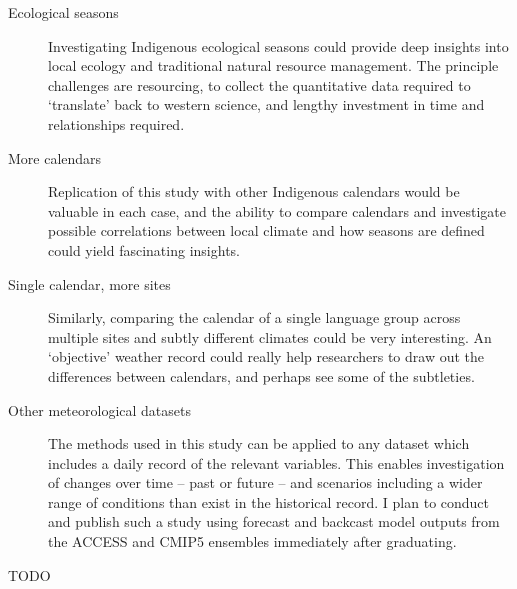 \begin{description}
\item[Ecological seasons]
        Investigating Indigenous ecological seasons could provide deep insights
        into local ecology and traditional natural resource management.
        The principle challenges are resourcing, to collect the quantitative
        data required to `translate' back to western science, and lengthy
        investment in time and relationships required.

\item [More calendars]
        Replication of this study with other Indigenous calendars would be
        valuable in each case, and the ability to compare calendars and investigate
        possible correlations between local climate and how seasons are
        defined could yield fascinating insights.

\item [Single calendar, more sites]
        Similarly, comparing the calendar of a single language group across
        multiple sites and subtly different climates could be very interesting.
        An `objective' weather record could really help researchers to draw out
        the differences between calendars, and perhaps see some of the subtleties.

\item [Other meteorological datasets]
        The methods used in this study can be applied to any dataset which
        includes a daily record of the relevant variables.  This enables
        investigation of changes over time -- past or future -- and scenarios
        including a wider range of conditions than exist in the historical record.
        I plan to conduct and publish such a study using forecast and backcast
        model outputs from the ACCESS and CMIP5 ensembles immediately
        after graduating.

\item [TODO]

\end{description}



